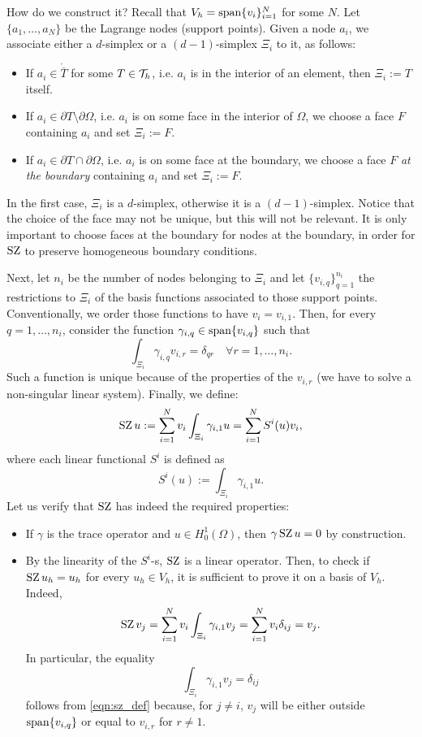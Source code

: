 How do we construct it? Recall that $V_h = \operatorname{span}\{v_i\}_{i=1}^N$ for some $N$. Let $\{a_1, \dots , a_N\}$ be the Lagrange nodes (support points).
Given a node $a_i$, we associate either a $d$-simplex or a $(d-1)$-simplex $\Xi_i$ to it, as follows:
\begin{itemize}
    \item If $a_i \in \mathring{\overline{T}}$ for some $T \in \mathcal{T}_h$, i.e. $a_i$ is in the interior of an element, then $\Xi_i := T$ itself.
    \item If $a_i \in \partial T \setminus \partial \Omega$, i.e. $a_i$ is on some face in the interior of $\Omega$, we choose a face $F$ containing $a_i$ and set $\Xi_i := F$.
    \item If $a_i \in \partial T \cap \partial \Omega$, i.e. $a_i$ is on some face at the boundary, we choose a face $F$ \emph{at the boundary} containing $a_i$ and set $\Xi_i := F$.
\end{itemize}
In the first case, $\Xi_i$ is a $d$-simplex, otherwise it is a $(d-1)$-simplex. Notice that the choice of the face may not be unique, but this will not be relevant. It is only important to choose faces at the boundary for nodes at the boundary, in order for $\operatorname{SZ}$ to preserve homogeneous boundary conditions.

Next, let $n_i$ be the number of nodes belonging to $\Xi_i$ and let $\{v_{i,q}\}_{q=1}^{n_i}$ the restrictions to $\Xi_i$ of the basis functions associated to those support points. Conventionally, we order those functions to have $v_i = v_{i,1}$. Then, for every $q=1,\dots,n_i$, consider the function $\gamma_{i,q} \in \operatorname{span}\{v_{i,q}\}$ such that
\begin{equation}\label{eqn:sz_def}
    \int_{\Xi_i} \gamma_{i,q} v_{i,r} = \delta_{qr} \quad \forall r=1,\dots,n_i.
\end{equation}
Such a function is unique because of the properties of the $v_{i,r}$ (we have to solve a non-singular linear system). Finally, we define:
\[
\operatorname{SZ} u := \sum_{i=1}^N v_i \int_{\Xi_i} \gamma_{i,1} u = 
\sum_{i=1}^N S^i(u) v_i,
\]
where each linear functional $S^i$ is defined as
\[
S^i(u) := \int_{\Xi_i} \gamma_{i,1} u.
\]
Let us verify that $\operatorname{SZ}$ has indeed the required properties:
\begin{itemize}
    \item If $\gamma$ is the trace operator and $u \in H^1_0(\Omega)$, then $\gamma \operatorname{SZ} u = 0$ by construction.
    \item By the linearity of the $S^i$-s, $\operatorname{SZ}$ is a linear operator. Then, to check if $\operatorname{SZ} u_h = u_h$ for every $u_h \in V_h$, it is sufficient to prove it on a basis of $V_h$. Indeed,
    \[
        \operatorname{SZ} v_j = \sum_{i=1}^N v_i \int_{\Xi_i} \gamma_{i,1} v_j = \sum_{i=1}^N v_i \delta_{ij} = v_j.
    \]
    In particular, the equality
    \[
    \int_{\Xi_i} \gamma_{i,1} v_j = \delta_{ij}
    \]
    follows from \eqref{eqn:sz_def} because, for $j \ne i$, $v_j$ will be either outside $\operatorname{span}\{v_{i,q}\}$ or equal to $v_{i,r}$ for $r \ne 1$.
\end{itemize}

